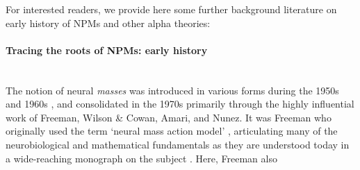 \documentclass[12pt,twoside]{article}
\begin{document}
For interested readers, we provide here some further background literature on early history of NPMs and other alpha theories:

\paragraph{Tracing the roots of NPMs: early history}~\\
The notion of neural \textit{masses} was introduced in various forms during the 1950s and 1960s \citep{beurle1956properties, griffith1963field}, and consolidated in the 1970s primarily through the highly influential work of Freeman, Wilson \& Cowan, Amari, and Nunez. It was Freeman who originally used the term `neural mass action model' \citep{freeman1972linear, freeman1972waves, freeman1975mass}, articulating many of the neurobiological and mathematical fundamentals as they are understood today in a wide-reaching monograph on the subject \citep{freeman1975mass}. Here, Freeman also %
\end{document}
